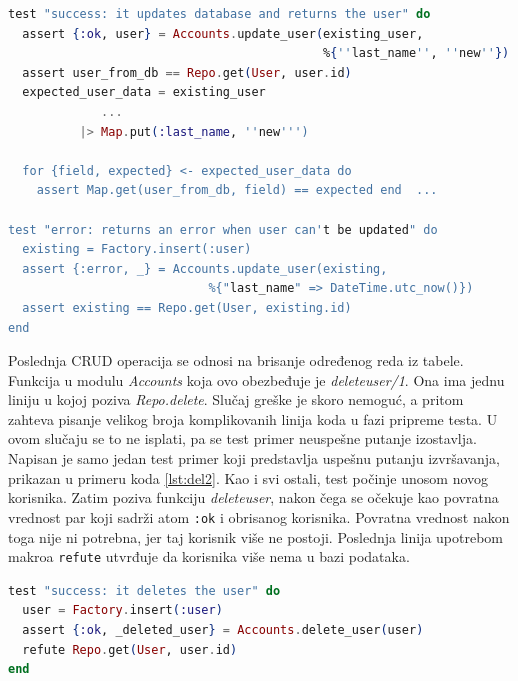 \documentclass[12pt,oneside]{memoir}
\begin{document}
\begin{minipage}{\linewidth}
\begin{lstlisting}[language=elixir, basicstyle=\small, caption={Testiranje funkcije \emph{update{\textunderscore}user/2}},captionpos=b, label={lst:upd}]
test "success: it updates database and returns the user" do
  assert {:ok, user} = Accounts.update_user(existing_user,
  						                    %{''last_name'', ''new''})
  assert user_from_db == Repo.get(User, user.id)
  expected_user_data = existing_user
        	 ...
          |> Map.put(:last_name, ''new''')
          
  for {field, expected} <- expected_user_data do
    assert Map.get(user_from_db, field) == expected end  ...

test "error: returns an error when user can't be updated" do
  existing = Factory.insert(:user)
  assert {:error, _} = Accounts.update_user(existing, 
  							%{"last_name" => DateTime.utc_now()})
  assert existing == Repo.get(User, existing.id)
end
 \end{lstlisting}
\end{minipage}

\par Poslednja CRUD operacija se odnosi na brisanje određenog reda iz tabele. Funkcija u modulu \emph{Accounts} koja ovo obezbeđuje je \emph{delete{\textunderscore}user/1}. Ona ima jednu liniju u kojoj poziva \emph{Repo.delete}. Slučaj greške je skoro nemoguć, a pritom zahteva pisanje velikog broja komplikovanih linija koda u fazi pripreme testa. U ovom slučaju se to ne isplati, pa se test primer neuspešne putanje izostavlja. Napisan je samo jedan test primer koji predstavlja uspešnu putanju izvršavanja, prikazan u primeru koda \ref{lst:del2}. Kao i svi ostali, test počinje unosom novog korisnika. Zatim poziva funkciju \emph{delete{\textunderscore}user}, nakon čega se očekuje kao povratna vrednost par koji sadrži atom \texttt{:ok} i obrisanog korisnika. Povratna vrednost nakon toga nije ni potrebna, jer taj korisnik više ne postoji. Poslednja linija upotrebom makroa \texttt{refute} utvrđuje da korisnika više nema u bazi podataka. \\

\begin{minipage}{\linewidth}
\begin{lstlisting}[language=elixir, basicstyle=\small, caption={Testiranje funkcije \emph{delete{\textunderscore}user/1}},captionpos=b, label={lst:del2}]
test "success: it deletes the user" do
  user = Factory.insert(:user)
  assert {:ok, _deleted_user} = Accounts.delete_user(user)
  refute Repo.get(User, user.id)
end
\end{lstlisting}
\end{minipage}
\end{document}
